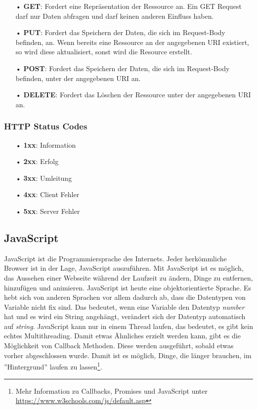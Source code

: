 \begin{itemize}
\item[•] \textbf{GET}: Fordert eine Repräsentation der Ressource an. Ein GET Request darf nur Daten abfragen und darf keinen anderen Einfluss haben.
\item[•] \textbf{PUT}: Fordert das Speichern der Daten, die sich im Request-Body befinden, an. Wenn bereits eine Ressource an der angegebenen \ac{URI} existiert, so wird diese aktualisiert, sonst wird die Resource erstellt.
\item[•] \textbf{POST}: Fordert das Speichern der Daten, die sich im Request-Body befinden, unter der angegebenen \ac{URI} an. 
\item[•] \textbf{DELETE}: Fordert das Löschen der Ressource unter der angegebenen \ac{URI} an.
\end{itemize}

\subsubsection{HTTP Status Codes}
\label{sec:http-status-codes}
\begin{itemize}
\item[•] \textbf{1xx}: Information
\item[•] \textbf{2xx}: Erfolg
\item[•] \textbf{3xx}: Umleitung
\item[•] \textbf{4xx}: Client Fehler
\item[•] \textbf{5xx}: Server Fehler
\end{itemize}

\subsection{JavaScript}
\label{sec:vor-js}
JavaScript ist die Programmiersprache des Internets. Jeder herkömmliche Browser ist in der Lage, JavaScript auszuführen. Mit JavaScript ist es möglich, das Aussehen einer Webseite während der Laufzeit zu ändern, Dinge zu entfernen, hinzufügen und animieren. JavaScript ist heute eine objektorientierte Sprache. Es hebt sich von anderen Sprachen vor allem dadurch ab, dass die Datentypen von Variable nicht fix sind. Das bedeutet, wenn eine Variable den Datentyp \textit{number} hat und es wird ein String angehängt, verändert sich der Datentyp automatisch auf \textit{string}. JavaScript kann nur in einem Thread laufen, das bedeutet, es gibt kein echtes Multithreading. Damit etwas Ähnliches erzielt werden kann, gibt es die Möglichkeit von Callback Methoden. Diese werden ausgeführt, sobald etwas vorher abgeschlossen wurde. Damit ist es möglich, Dinge, die länger brauchen, im ''Hintergrund'' laufen zu lassen\footnote{Mehr Information zu Callbacks, Promises und JavaScript unter \url{https://www.w3schools.com/js/default.asp}}.

